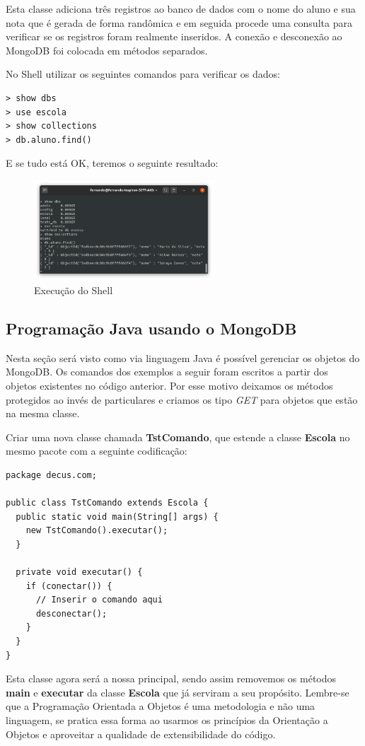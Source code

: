Esta classe adiciona três registros ao banco de dados com o nome do aluno e sua nota que é gerada de forma randômica e em seguida procede uma consulta para verificar se os registros foram realmente inseridos. A conexão e desconexão ao MongoDB foi colocada em métodos separados.

No Shell utilizar os seguintes comandos para verificar os dados:
\begin{lstlisting}[]
> show dbs
> use escola
> show collections
> db.aluno.find()
\end{lstlisting}

E se tudo está OK, teremos o seguinte resultado:
\begin{figure}[H]
	\centering
	\includegraphics[width=0.6\textwidth]{imagens/testeOK.png}
	\caption{Execução do Shell}
\end{figure}

\subsection{Programação Java usando o MongoDB}
Nesta seção será visto como via linguagem Java é possível gerenciar os objetos do MongoDB. Os comandos dos exemplos a seguir foram escritos a partir dos objetos existentes no código anterior. Por esse motivo deixamos os métodos protegidos ao invés de particulares e criamos os tipo \textit{GET} para objetos que estão na mesma classe.

Criar uma nova classe chamada \textbf{TstComando}, que estende a classe \textbf{Escola} no mesmo pacote com a seguinte codificação:
\begin{lstlisting}[]
package decus.com;
	
public class TstComando extends Escola {
  public static void main(String[] args) {
    new TstComando().executar();
  }

  private void executar() {
    if (conectar()) {
      // Inserir o comando aqui
      desconectar();
    }
  }
}
\end{lstlisting}

Esta classe agora será a nossa principal, sendo assim removemos os métodos \textbf{main} e \textbf{executar} da classe \textbf{Escola} que já serviram a seu propósito. Lembre-se que a Programação Orientada a Objetos é uma metodologia e não uma linguagem, se pratica essa forma ao usarmos os princípios da Orientação a Objetos e aproveitar a qualidade de extensibilidade do código.

